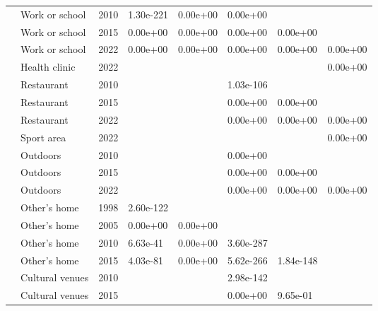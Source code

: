 \documentclass[preprint, 3p,
authoryear]{elsarticle} %
\begin{document}
\begin{longtable}[t]{llllllll}
\nopagebreak
 & Work or school & 2010 & 1.30e-221 & 0.00e+00 & 0.00e+00 &  & \\
\nopagebreak
 & Work or school & 2015 & 0.00e+00 & 0.00e+00 & 0.00e+00 & 0.00e+00 & \\
\nopagebreak
 & Work or school & 2022 & 0.00e+00 & 0.00e+00 & 0.00e+00 & 0.00e+00 & 0.00e+00\\
\nopagebreak
 & Health clinic & 2022 &  &  &  &  & 0.00e+00\\
\nopagebreak
 & Restaurant & 2010 &  &  & 1.03e-106 &  & \\
\nopagebreak
 & Restaurant & 2015 &  &  & 0.00e+00 & 0.00e+00 & \\
\nopagebreak
 & Restaurant & 2022 &  &  & 0.00e+00 & 0.00e+00 & 0.00e+00\\
\nopagebreak
 & Sport area & 2022 &  &  &  &  & 0.00e+00\\
\nopagebreak
 & Outdoors & 2010 &  &  & 0.00e+00 &  & \\
\nopagebreak
 & Outdoors & 2015 &  &  & 0.00e+00 & 0.00e+00 & \\
\nopagebreak
 & Outdoors & 2022 &  &  & 0.00e+00 & 0.00e+00 & 0.00e+00\\
\nopagebreak
 & Other's home & 1998 & 2.60e-122 &  &  &  & \\
\nopagebreak
 & Other's home & 2005 & 0.00e+00 & 0.00e+00 &  &  & \\
\nopagebreak
 & Other's home & 2010 & 6.63e-41 & 0.00e+00 & 3.60e-287 &  & \\
\nopagebreak
 & Other's home & 2015 & 4.03e-81 & 0.00e+00 & 5.62e-266 & 1.84e-148 & \\
\nopagebreak
 & Cultural venues & 2010 &  &  & 2.98e-142 &  & \\
\nopagebreak
\multirow[t]{-27}{*}{\raggedright\arraybackslash Cycling} & Cultural venues & 2015 &  &  & 0.00e+00 & 9.65e-01 & \\
\bottomrule
\end{longtable}
\endgroup{}


\end{document}
